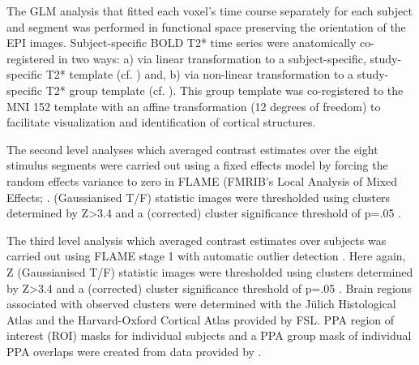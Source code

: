 \documentclass[english]{article}
\begin{document}
The GLM analysis that fitted each voxel's time course separately for each
subject and segment was performed in functional space preserving the orientation
of the EPI images.
Subject-specific BOLD T2* time series were anatomically co-registered in two
ways:
a) via linear transformation to a subject-specific, study-specific T2* template
(cf. \citep{sengupta2016extension}) and,
b) via non-linear transformation to a study-specific T2* group template (cf.
\citep{hanke2014audiomovie}).
This group template was co-registered to the MNI 152 template with an affine
transformation (12 degrees of freedom) to facilitate visualization and
identification of cortical structures.

The second level analyses which averaged contrast estimates over the eight
stimulus segments were carried out using a fixed effects model by forcing the
random effects variance to zero in FLAME (FMRIB's Local Analysis of Mixed
Effects; \citep{beckmann2003general, woolrich2004multilevel}.
(Gaussianised T/F) statistic images were thresholded using clusters determined
by Z>3.4 and a (corrected) cluster significance threshold of p=.05
\citep{worsley2001statistical}.

The third level analysis which averaged contrast estimates over subjects was
carried out using FLAME stage 1 with automatic outlier detection
\citep{beckmann2003general, woolrich2004multilevel, woolrich2008robust}.
Here again, Z (Gaussianised T/F) statistic images were thresholded using
clusters determined by Z>3.4 and a (corrected) cluster significance threshold of
p=.05 \citep{worsley2001statistical}.
Brain regions associated with observed clusters were determined with the Jülich
Histological Atlas \citep{eickhoff2005toolbox, eickhoff2007assignment} and the
Harvard-Oxford Cortical Atlas \citep{desikan2006automated} provided by FSL.
PPA region of interest (ROI) masks for individual subjects and a PPA group mask
of individual PPA overlaps were created from data provided by
\citep{sengupta2016extension}.
\end{document}
